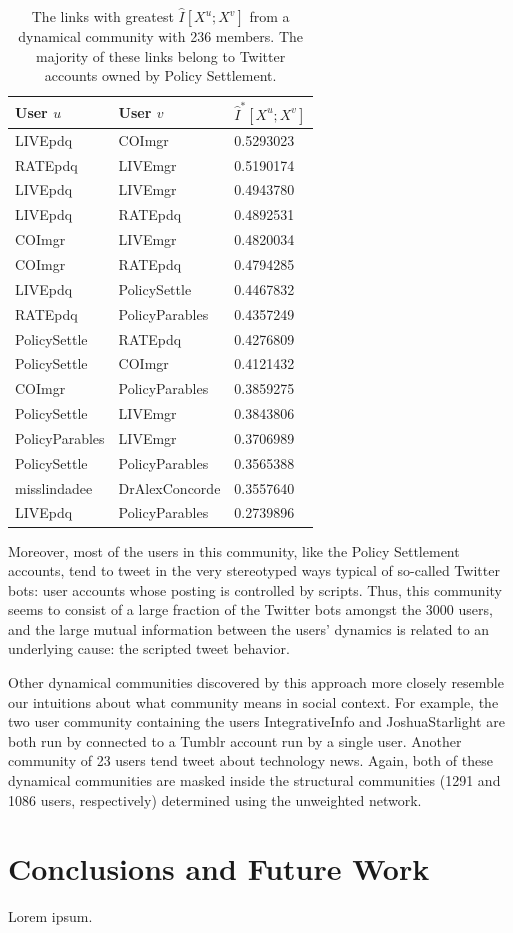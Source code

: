 \documentclass[12pt]{article}
\begin{document}
\begin{table}
	\caption{The links with greatest $\hat{I}[X^{u}; X^{v}]$ from a dynamical community with 236 members. The majority of these links belong to Twitter accounts owned by Policy Settlement.}
	\centering
	\begin{tabular}{l l l}
		User $u$ & User $v$ & $\hat{I}^{*}[X^{u}; X^{v}]$ \\ \hline
		LIVEpdq & COImgr & 0.5293023 \\
		RATEpdq & LIVEmgr & 0.5190174 \\
		LIVEpdq & LIVEmgr & 0.4943780 \\
		LIVEpdq & RATEpdq & 0.4892531 \\
		COImgr & LIVEmgr & 0.4820034 \\
		COImgr & RATEpdq & 0.4794285 \\
		LIVEpdq & PolicySettle & 0.4467832 \\
		RATEpdq & PolicyParables & 0.4357249 \\
		PolicySettle & RATEpdq & 0.4276809 \\
		PolicySettle & COImgr & 0.4121432 \\
		COImgr & PolicyParables & 0.3859275 \\
		PolicySettle & LIVEmgr & 0.3843806 \\
		PolicyParables & LIVEmgr & 0.3706989 \\
		PolicySettle & PolicyParables & 0.3565388 \\
		misslindadee & DrAlexConcorde & 0.3557640 \\
		LIVEpdq & PolicyParables & 0.2739896 \\
	\end{tabular}
	\label{Tab-Ranked_nMI}
\end{table}

Moreover, most of the users in this community, like the Policy Settlement accounts, tend to tweet in the very stereotyped ways typical of so-called Twitter bots: user accounts whose posting is controlled by scripts. Thus, this community seems to consist of a large fraction of the Twitter bots amongst the 3000 users, and the large mutual information between the users' dynamics is related to an underlying cause: the scripted tweet behavior.

Other dynamical communities discovered by this approach more closely resemble our intuitions about what community means in social context. For example, the two user community containing the users IntegrativeInfo and JoshuaStarlight are both run by connected to a Tumblr account run by a single user. Another community of 23 users tend tweet about technology news. Again, both of these dynamical communities are masked inside the structural communities (1291 and 1086 users, respectively) determined using the unweighted network.

\section{Conclusions and Future Work}

Lorem ipsum.

\clearpage
\newpage



\end{document}
